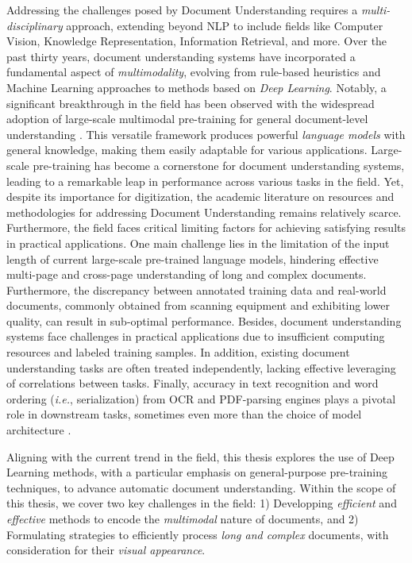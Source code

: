 Addressing the challenges posed by Document Understanding requires a \textit{multi-disciplinary} approach, extending beyond \ac{NLP} to include fields like Computer Vision, Knowledge Representation, Information Retrieval, and more. Over the past thirty years, document understanding systems have incorporated a fundamental aspect of \textit{multimodality}, evolving from rule-based heuristics and Machine Learning approaches to methods based on \textit{Deep Learning}. Notably, a significant breakthrough in the field has been observed with the widespread adoption of large-scale multimodal pre-training for general document-level understanding \citep{vaswani2017attention, xu2020layoutlm}. This versatile framework produces powerful \textit{language models} with general knowledge, making them easily adaptable for various applications. Large-scale pre-training has become a cornerstone for document understanding systems, leading to a remarkable leap in performance across various tasks in the field. Yet, despite its importance for digitization, the academic literature on resources and methodologies for addressing Document Understanding remains relatively scarce. Furthermore, the field faces critical limiting factors for achieving satisfying results in practical applications. One main challenge lies in the limitation of the input length of current large-scale pre-trained language models, hindering effective multi-page and cross-page understanding of long and complex documents. Furthermore, the discrepancy between annotated training data and real-world documents, commonly obtained from scanning equipment and exhibiting lower quality, can result in sub-optimal performance. Besides, document understanding systems face challenges in practical applications due to insufficient computing resources and labeled training samples. In addition, existing document understanding tasks are often treated independently, lacking effective leveraging of correlations between tasks. Finally, accuracy in text recognition and word ordering (\textit{i.e.}, serialization) from \ac{OCR} and PDF-parsing engines plays a pivotal role in downstream tasks, sometimes even more than the choice of model architecture \citep{borchmann2021due}.

Aligning with the current trend in the field, this thesis explores the use of Deep Learning methods, with a particular emphasis on general-purpose pre-training techniques, to advance automatic document understanding. Within the scope of this thesis, we cover two key challenges in the field: 1) Developping \textit{efficient} and \textit{effective} methods to encode the \textit{multimodal} nature of documents, and 2) Formulating strategies to efficiently process \textit{long and complex} documents, with consideration for their \textit{visual appearance}.

